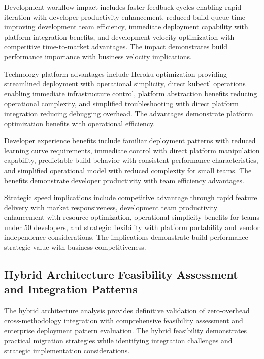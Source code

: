 Development workflow impact includes faster feedback cycles enabling rapid iteration with developer productivity enhancement, reduced build queue time improving development team efficiency, immediate deployment capability with platform integration benefits, and development velocity optimization with competitive time-to-market advantages. The impact demonstrates build performance importance with business velocity implications.

Technology platform advantages include Heroku optimization providing streamlined deployment with operational simplicity, direct kubectl operations enabling immediate infrastructure control, platform abstraction benefits reducing operational complexity, and simplified troubleshooting with direct platform integration reducing debugging overhead. The advantages demonstrate platform optimization benefits with operational efficiency.

Developer experience benefits include familiar deployment patterns with reduced learning curve requirements, immediate control with direct platform manipulation capability, predictable build behavior with consistent performance characteristics, and simplified operational model with reduced complexity for small teams. The benefits demonstrate developer productivity with team efficiency advantages.

Strategic speed implications include competitive advantage through rapid feature delivery with market responsiveness, development team productivity enhancement with resource optimization, operational simplicity benefits for teams under 50 developers, and strategic flexibility with platform portability and vendor independence considerations. The implications demonstrate build performance strategic value with business competitiveness.


\subsection{Hybrid Architecture Feasibility Assessment and Integration Patterns}
\label{subsec:hybrid_architecture}

The hybrid architecture analysis provides definitive validation of zero-overhead cross-methodology integration with comprehensive feasibility assessment and enterprise deployment pattern evaluation. The hybrid feasibility demonstrates practical migration strategies while identifying integration challenges and strategic implementation considerations.

